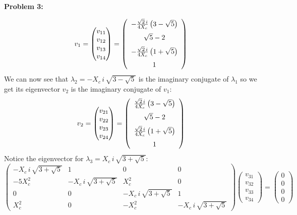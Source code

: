 \documentclass[11pt]{article}
\newcommand{\spacer}{\noalign{\medskip}}
\newenvironment{problem}[1]{\textbf{Problem #1: }}{\newpage}
\begin{document}
\begin{problem}{3}
\begin{enumerate}[label = (\alph*)]
			\[v_1 = \begin{pmatrix}
				v_{11} \\ v_{12} \\ v_{13} \\ v_{14}
			\end{pmatrix} = \left(\begin{array}{c}
				-\frac{\sqrt{2}\,i}{4X_c}\left(3 - \sqrt{5}\right)	\\
				\spacer \sqrt{5} - 2 \\
				\spacer -\frac{\sqrt{2}\,i}{4X_c}\left(1 + \sqrt{5}\right) \\
				\spacer 1
			\end{array}\right)\]
			We can now see that $\lambda_2 = -X_c\,i\,\sqrt{3 - \sqrt{5}}$ is the imaginary conjugate of $\lambda_1$ so we get its eigenvector $v_2$ is the imaginary conjugate of $v_1$:
			\[v_2 = \begin{pmatrix}
				v_{21} \\ v_{22} \\ v_{23} \\ v_{24}
			\end{pmatrix} = \left(\begin{array}{c}
				\frac{\sqrt{2}\,i}{4X_c}\left(3 - \sqrt{5}\right)	\\
				\spacer \sqrt{5} - 2 \\
				\spacer \frac{\sqrt{2}\,i}{4X_c}\left(1 + \sqrt{5}\right) \\
				\spacer 1
			\end{array}\right)\]
			\newpage
			Notice the eigenvector for $\lambda_3 = X_c\,i\,\sqrt{3 + \sqrt{5}}$:
			\[\begin{pmatrix}
				-X_c\,i\,\sqrt{3 + \sqrt{5}} & 1 & 0 & 0 \\
				-5X^2_c & -X_c\,i\,\sqrt{3 + \sqrt{5}} & X^2_c & 0 \\
				0 & 0 & -X_c\,i\,\sqrt{3 + \sqrt{5}} & 1 \\
				X^2_c & 0 & -X^2_c & -X_c\,i\,\sqrt{3 + \sqrt{5}}
			\end{pmatrix}\begin{pmatrix}
				v_{31} \\ v_{32} \\ v_{33} \\ v_{34}
			\end{pmatrix} = \begin{pmatrix}
				0 \\ 0 \\ 0 \\ 0
			\end{pmatrix} \]

\end{enumerate}
\end{problem}
\end{document}
